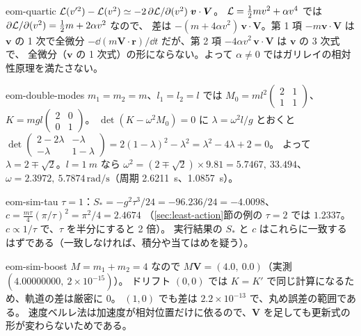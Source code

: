 \begin{solution}{eom-quartic}
$\mathcal{L}(v'^2)-\mathcal{L}(v^2)\simeq-2\,\partial\mathcal{L}/\partial(v^2)\;\bm v\cdot\bm V$。
$\mathcal{L}=\tfrac12mv^2+\alpha v^4$ では $\partial\mathcal{L}/\partial(v^2)=\tfrac12m+2\alpha v^2$ なので、
差は $-(m+4\alpha v^2)\,\bm v\cdot\bm V$。第 1 項 $-m\bm v\cdot\bm V$ は $\bm v$ の 1 次で全微分
$-\dd(m\bm V\cdot\bm r)/\dd t$ だが、第 2 項 $-4\alpha v^2\,\bm v\cdot\bm V$ は $\bm v$ の 3 次式で、
全微分（$\bm v$ の 1 次式）の形にならない。よって $\alpha\ne0$ ではガリレイの相対性原理を満たさない。
\end{solution}

\begin{solution}{eom-double-modes}
$m_1=m_2=m$、$l_1=l_2=l$ では $M_0=ml^2\begin{pmatrix}2&1\\1&1\end{pmatrix}$、$K=mgl\begin{pmatrix}2&0\\0&1\end{pmatrix}$。
$\det(K-\omega^2M_0)=0$ に $\lambda=\omega^2l/g$ とおくと
$\det\begin{pmatrix}2-2\lambda&-\lambda\\-\lambda&1-\lambda\end{pmatrix}=2(1-\lambda)^2-\lambda^2=\lambda^2-4\lambda+2=0$。
よって $\lambda=2\mp\sqrt2$。$l=\qty{1}{m}$ なら $\omega^2=(2\mp\sqrt2)\times9.81=5.7467,\ 33.494$、
$\omega=2.3972,\ 5.7874\,\mathrm{rad/s}$（周期 \qty{2.6211}{s}、\qty{1.0857}{s}）。
\end{solution}

\begin{solution}{eom-sim-tau}
$\tau=1$：$S_*=-g^2\tau^3/24=-96.236/24=-4.0098$、$c=\tfrac{m\tau}4(\pi/\tau)^2=\pi^2/4=2.4674$
（\ref{sec:least-action}節の例の $\tau=2$ では $1.2337$。$c\propto1/\tau$ で、$\tau$ を半分にすると 2 倍）。
実行結果の $S_*$ と $c$ はこれらに一致するはずである（一致しなければ、積分や当てはめを疑う）。
\end{solution}

\begin{solution}{eom-sim-boost}
$M=m_1+m_2=4$ なので $M\bm V=(4.0,\ 0.0)$（実測 $(4.00000000,\ 2\times10^{-15})$）。
ドリフト $(0,0)$ では $K=K'$ で同じ計算になるため、軌道の差は厳密に $0$。
$(1,0)$ でも差は $2.2\times10^{-13}$ で、丸め誤差の範囲である。
速度ベルレ法は加速度が相対位置だけに依るので、$\bm V$ を足しても更新式の形が変わらないためである。
\end{solution}
